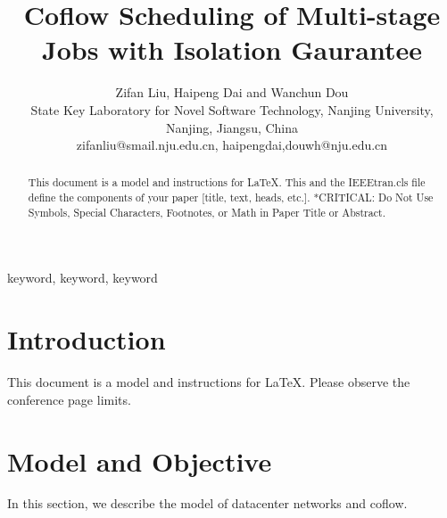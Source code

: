 \documentclass[10pt, conference, letterpaper]{IEEEtran}
\begin{document}
\title{Coflow Scheduling of Multi-stage Jobs with Isolation Gaurantee}

\author{Zifan Liu, Haipeng Dai and Wanchun Dou\\
State Key Laboratory for Novel Software Technology, Nanjing University, Nanjing, Jiangsu, China\\
zifanliu@smail.nju.edu.cn, haipengdai,douwh@nju.edu.cn}

\maketitle

\begin{abstract}
This document is a model and instructions for \LaTeX.
This and the IEEEtran.cls file define the components of your paper [title, text, heads, etc.]. *CRITICAL: Do Not Use Symbols, Special Characters, Footnotes,
or Math in Paper Title or Abstract.
\end{abstract}

\begin{IEEEkeywords}
keyword, keyword, keyword
\end{IEEEkeywords}

\section{Introduction}
This document is a model and instructions for \LaTeX.\cite{HUG}
Please observe the conference page limits.

\section{Model and Objective}
In this section, we describe the model of datacenter networks and coflow.
\end{document}
